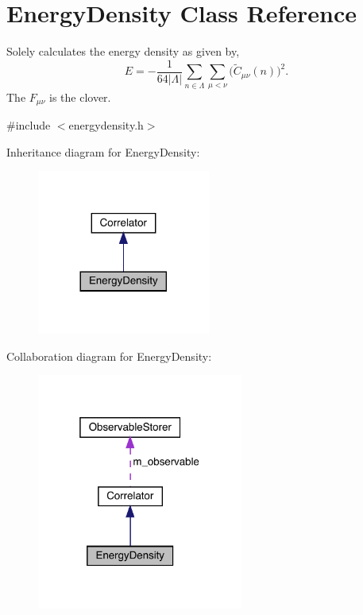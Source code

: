 \hypertarget{class_energy_density}{}\section{Energy\+Density Class Reference}
\label{class_energy_density}


Solely calculates the energy density as given by, \[ E = -\frac{1}{64|\Lambda|} \sum_{n\in\Lambda}\sum_{\mu<\nu} \big(\tilde{C}_{\mu\nu}(n)\big)^2. \] The $F_{\mu\nu}$ is the clover.  




{\ttfamily \#include $<$energydensity.\+h$>$}



Inheritance diagram for Energy\+Density\+:
\nopagebreak
\begin{figure}[H]
\begin{center}
\leavevmode
\includegraphics[width=161pt]{class_energy_density__inherit__graph}
\end{center}
\end{figure}


Collaboration diagram for Energy\+Density\+:
\nopagebreak
\begin{figure}[H]
\begin{center}
\leavevmode
\includegraphics[width=193pt]{class_energy_density__coll__graph}
\end{center}
\end{figure}
